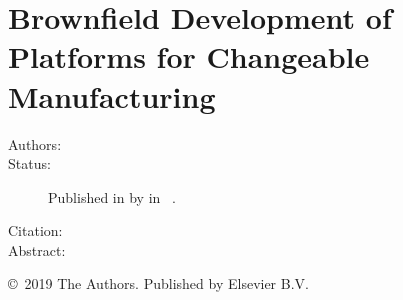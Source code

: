 \chapter[Brownfield Development of Platforms]{Brownfield Development of Platforms for Changeable Manufacturing}\label{paper:CMS2019}
\setcounter{page}{123}

\begin{description}
  \item[Authors:]
  \item[Status:] Published in \citeyear{SorensenCMS2019} by  in ~.
  \item[Citation:]
  \item[Abstract:] 
\end{description}

\vfill
\noindent\copyright~2019 The Authors. Published by Elsevier B.V.

% 